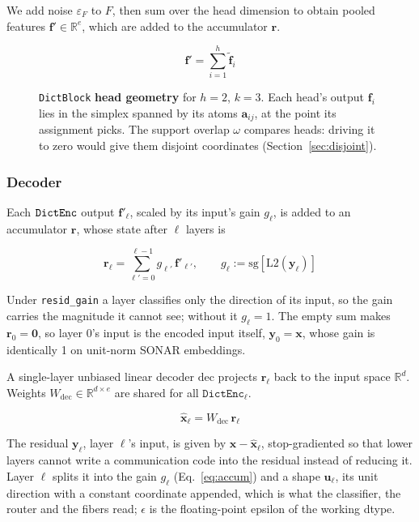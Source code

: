 We add noise $\varepsilon_F$ to $F$, then sum over the head dimension to obtain
pooled features $\mathbf{f}' \in \mathbb{R}^{e}$, which are added to the
accumulator $\mathbf{r}$.

\begin{equation}
	\mathbf{f}' = \sum^{h}_{i=1}\tilde{\mathbf{f}}_{i}
	\label{eq:pool}
\end{equation}

\begin{figure}[tp]
\centering

\caption[Per-head geometry]{\texttt{DictBlock} \textbf{head geometry} for $h{=}2$, $k{=}3$.
	Each head's output $\mathbf{f}_i$ lies in the simplex spanned by its
	atoms $\mathbf{a}_{ij}$, at the point its assignment picks. The support
	overlap $\omega$ compares heads: driving it to zero would give them
	disjoint coordinates (Section~\ref{sec:disjoint}).}
\label{fig:head-simplex}
\end{figure}

\subsubsection{Decoder}
\label{sec:decoder}
Each $\mathop{\mathtt{DictEnc}}\limits$ output $\mathbf{f}'_\ell$, scaled by its input's gain
$g_\ell$, is added to an accumulator $\mathbf{r}$, whose state after
$\ell$ layers is

\begin{equation}
	\mathbf{r}_\ell = \sum_{\ell'=0}^{\ell-1} g_{\ell'}\,\mathbf{f}'_{\ell'},
	\qquad
	g_\ell := \mathrm{sg}\!\left[\mathrm{L2}(\mathbf{y}_\ell)\right]
	\label{eq:accum}
\end{equation}

Under \texttt{resid\_gain} a layer classifies only the direction of its
input, so the gain carries the magnitude it cannot see; without it
$g_\ell = 1$. The empty sum makes $\mathbf{r}_0 = \mathbf{0}$, so layer 0's
input is the encoded input itself, $\mathbf{y}_0 = \mathbf{x}$, whose gain
is identically 1 on unit-norm SONAR embeddings.

A single-layer unbiased linear decoder $\mathrm{dec}$ projects
$\mathbf{r}_\ell$ back to the input space $\mathbb{R}^d$. Weights
$W_{\mathrm{dec}} \in \mathbb{R}^{d \times e}$
are shared for all $\mathtt{DictEnc}_\ell$.

\begin{equation}
	\hat{\mathbf{x}}_\ell = W_{\mathrm{dec}}\,\mathbf{r}_\ell
	\label{eq:dec}
\end{equation}

The residual $\mathbf{y}_\ell$, layer $\ell$'s input, is given by
$\mathbf{x} - \hat{\mathbf{x}}_\ell$, stop-gradiented so that
lower layers cannot write a communication code into the residual instead
of reducing it. Layer $\ell$ splits it into the gain $g_\ell$
(Eq.~\eqref{eq:accum}) and a shape $\mathbf{u}_\ell$, its unit direction
with a constant coordinate appended, which is what the classifier, the
router and the fibers read; $\epsilon$ is the floating-point epsilon of
the working dtype.

